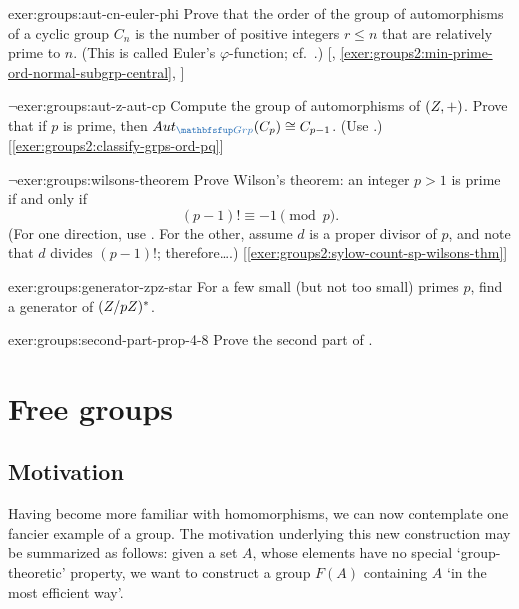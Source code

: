\begin{exer}{\exerused}{exer:groups:aut-cn-euler-phi}
  Prove that the order of the group of automorphisms of a cyclic group
  $C_n$ is the number of positive integers $r \leq n$ that are
  relatively prime to $n$.  (This is called Euler's
  $\varphi$-function; cf.\
  .)
  [,
  \ref{exer:groups2:min-prime-ord-normal-subgrp-central},
  ]
\end{exer}
\begin{exer}{$\lnot$}{exer:groups:aut-z-aut-cp}
  Compute the group of automorphisms of $(Z, +)$. Prove that if $p$
  is prime, then $\Aut_{\categ{Grp}}(C_p) \cong C_{p-1}$. (Use
  .)
  [\ref{exer:groups2:classify-grps-ord-pq}]
\end{exer}
\begin{exer}{$\lnot$}{exer:groups:wilsons-theorem}
  Prove Wilson's theorem: an integer $p > 1$ is prime if and only if
  \[
    (p-1)! \equiv -1 \pmod{p}.
  \]
  (For one direction, use
  . For
  the other,
  assume $d$ is a proper divisor of $p$, and note that $d$ divides
  $(p-1)!$; therefore\dots.)
  [\ref{exer:groups2:sylow-count-sp-wilsons-thm}]
\end{exer}
\begin{exer}{}{exer:groups:generator-zpz-star}
  For a few small (but not too small) primes $p$, find a generator of
  $(Z/pZ)^*$.
\end{exer}
\begin{exer}{}{exer:groups:second-part-prop-4-8}
  Prove the second part of
  .
\end{exer}

\section{Free groups}
\label{sec:groups:free-groups}


\subsection{Motivation}
\label{subsec:groups:motivation}
Having become more familiar with homomorphisms, we can now contemplate
one fancier example of a group. The motivation underlying this new
construction may be summarized as follows: given a set $A$, whose
elements have no special `group-theoretic' property, we want to
construct a group $F(A)$ containing $A$ `in the most efficient way'.

